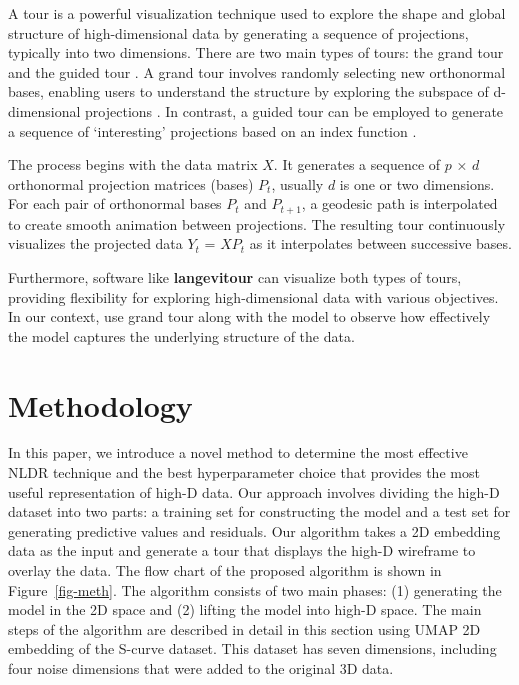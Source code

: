 \documentclass[
  12pt]{article}
\begin{document}
A tour is a powerful visualization technique used to explore the shape
and global structure of high-dimensional data by generating a sequence
of projections, typically into two dimensions. There are two main types
of tours: the grand tour \citep{Asimov1985} and the guided tour
\citep{article29}. A grand tour involves randomly selecting new
orthonormal bases, enabling users to understand the structure by
exploring the subspace of d-dimensional projections \citep{Asimov1985}.
In contrast, a guided tour can be employed to generate a sequence of
`interesting' projections based on an index function \citep{article29}.

The process begins with the data matrix \(X\). It generates a sequence
of \(p\) × \(d\) orthonormal projection matrices (bases) \(P_t\),
usually \(d\) is one or two dimensions. For each pair of orthonormal
bases \(P_t\) and \(P_{t+1}\), a geodesic path is interpolated to create
smooth animation between projections. The resulting tour continuously
visualizes the projected data \(Y_t\) = \(XP_t\) as it interpolates
between successive bases.

Furthermore, software like \textbf{langevitour} can visualize both types
of tours, providing flexibility for exploring high-dimensional data with
various objectives. In our context, use grand tour along with the model
to observe how effectively the model captures the underlying structure
of the data.

\hypertarget{sec-methods}{%
\section{Methodology}\label{sec-methods}}

In this paper, we introduce a novel method to determine the most
effective NLDR technique and the best hyperparameter choice that
provides the most useful representation of high-D data. Our approach
involves dividing the high-D dataset into two parts: a training set for
constructing the model and a test set for generating predictive values
and residuals. Our algorithm takes a 2D embedding data as the input and
generate a tour that displays the high-D wireframe to overlay the data.
The flow chart of the proposed algorithm is shown in
Figure~\ref{fig-meth}. The algorithm consists of two main phases: (1)
generating the model in the 2D space and (2) lifting the model into
high-D space. The main steps of the algorithm are described in detail in
this section using UMAP 2D embedding of the S-curve dataset. This
dataset has seven dimensions, including four noise dimensions that were
added to the original 3D data.
\end{document}
